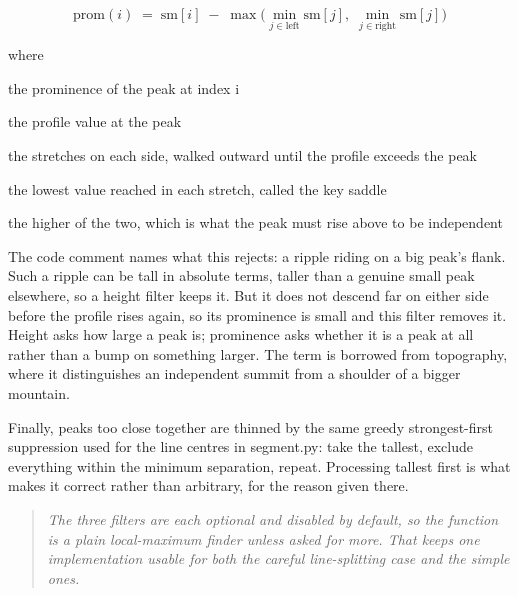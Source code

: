 \begin{equation}
\mathrm{prom}(i) \;=\; \mathrm{sm}[i] \;-\; \max\big(\min_{j \in \mathrm{left}} \mathrm{sm}[j],\; \min_{j \in \mathrm{right}} \mathrm{sm}[j]\big)
\end{equation}

\noindent where
\begin{description}[leftmargin=2.4em,style=nextline,font=\normalfont\ttfamily]\setlength\itemsep{1pt}
  \item[{$\mathrm{prom}(i)$}] \normalfont the prominence of the peak at index i
  \item[{$\mathrm{sm}[i]$}] \normalfont the profile value at the peak
  \item[{$\mathrm{left},\, \mathrm{right}$}] \normalfont the stretches on each side, walked outward until the profile exceeds the peak
  \item[{$\min$}] \normalfont the lowest value reached in each stretch, called the key saddle
  \item[{$\max$}] \normalfont the higher of the two, which is what the peak must rise above to be independent
\end{description}
The code comment names what this rejects: a ripple riding on a big peak's flank. Such a ripple can be tall in absolute terms, taller than a genuine small peak elsewhere, so a height filter keeps it. But it does not descend far on either side before the profile rises again, so its prominence is small and this filter removes it. Height asks how large a peak is; prominence asks whether it is a peak at all rather than a bump on something larger. The term is borrowed from topography, where it distinguishes an independent summit from a shoulder of a bigger mountain.


Finally, peaks too close together are thinned by the same greedy strongest-first suppression used for the line centres in segment.py: take the tallest, exclude everything within the minimum separation, repeat. Processing tallest first is what makes it correct rather than arbitrary, for the reason given there.


\begin{quote}\small\itshape The three filters are each optional and disabled by default, so the function is a plain local-maximum finder unless asked for more. That keeps one implementation usable for both the careful line-splitting case and the simple ones.\end{quote}


